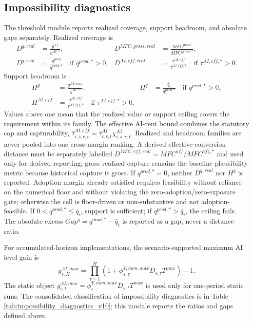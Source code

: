 \documentclass[11pt,a4paper]{article}
\begin{document}

\subsection{Impossibility diagnostics}

The threshold module reports realized coverage, support headroom, and absolute gaps separately. Realized coverage is
\begin{align}\label{eq:distance_ratios_main_v19}
    D^{g,real}&=\frac{g^{AI}}{g^{AI,*}},
    &D^{MFC,gross,real}&=\frac{MFC^{gross}}{MFC^{gross,*}},\\
    D^{q,real}&=\frac{q^{prod}}{q^{prod,*}}\quad\text{if }q^{prod,*}>0,
    &D^{AI,eff,real}&=\frac{\tau^{AI,eff}}{\tau^{AI,eff,*}}\quad\text{if }\tau^{AI,eff,*}>0.
\end{align}
Support headroom is
\begin{align}\label{eq:headroom_ratios_main_v19}
    H^g&=\frac{g^{AI,max}}{g^{AI,*}},
    &H^q&=\frac{\bar q_i}{q^{prod,*}}\quad\text{if }q^{prod,*}>0,\\
    H^{AI,eff}&=\frac{\bar\tau^{AI,eff}}{\tau^{AI,eff,*}}\quad\text{if }\tau^{AI,eff,*}>0.
\end{align}
Values above one mean that the realized value or support ceiling covers the requirement within its family. The effective AI-rent bound combines the statutory cap and capturability, $\bar\tau^{AI,eff}_{i,s,r,t}=\bar\tau^{AI}_{i,r,t}\chi^{AI}_{i,s,r,t}$. Realized and headroom families are never pooled into one cross-margin ranking. A derived effective-conversion distance must be separately labelled $D^{MFC,eff,real}=MFC^{eff}/MFC^{eff,*}$ and used only for derived reporting; gross realized capture remains the baseline plausibility metric because historical capture is gross.
If $q^{prod,*}=0$, neither $D^{q,real}$ nor $H^q$ is reported. Adoption-margin already satisfied requires feasibility without reliance on the numerical floor and without violating the zero-adoption/zero-exposure gate; otherwise the cell is floor-driven or non-substantive and not adoption-feasible. If $0<q^{prod,*}\leq\bar q_i$, support is sufficient; if $q^{prod,*}>\bar q_i$, the ceiling fails. The absolute excess $Gap^q=q^{prod,*}-\bar q_i$ is reported as a gap, never a distance ratio.


For accumulated-horizon implementations, the scenario-supported maximum AI level gain is
\begin{equation}
    g^{AI,max}_{s,H}=\prod_{\tau=1}^{H}\left(1+\phi^{Y,nom,max}_{s,\tau}D_{s,\tau}T^{max}\right)-1.
\end{equation}
The static object $g^{AI,max}_{s,t}=\phi^{Y,nom,max}_sD_{s,t}T^{max}$ is used only for one-period static runs. The consolidated classification of impossibility diagnostics is in Table \ref{tab:impossibility_diagnostics_v10}; this module reports the ratios and gaps defined above.
\end{document}
